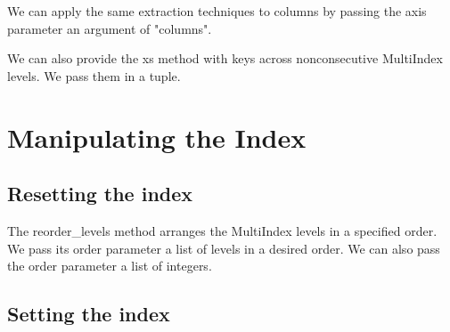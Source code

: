 We can apply the same extraction techniques to columns by passing the axis parameter an argument of "columns".

We can also provide the xs method with keys across nonconsecutive MultiIndex levels. We pass them in a tuple.
\section{Manipulating the Index}
\subsection{Resetting the index}
The reorder_levels method arranges the MultiIndex levels in a specified order. We pass its order parameter a list of levels in a desired order. We can also pass the order parameter a list of integers.

\subsection{Setting the index}